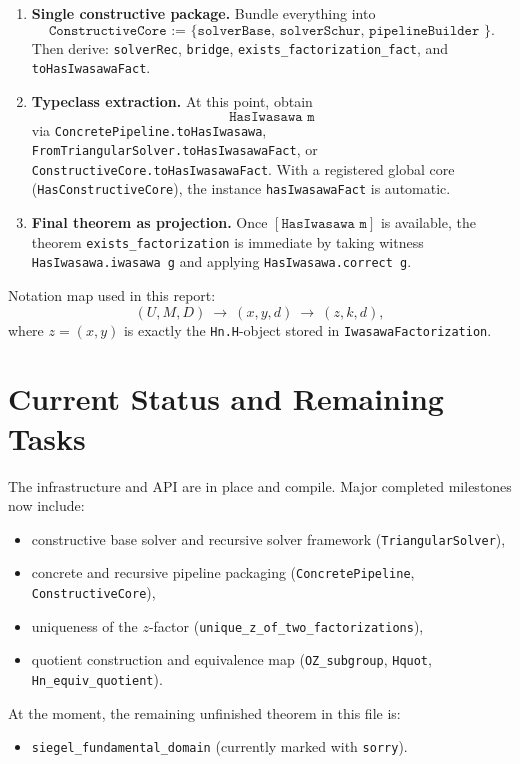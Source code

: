 \documentclass[11pt]{article}
\begin{document}
\begin{enumerate}[leftmargin=1.5em]
\item \textbf{Single constructive package.}
Bundle everything into
\[
\texttt{ConstructiveCore := \{ solverBase, solverSchur, pipelineBuilder \}}.
\]
Then derive:
\texttt{solverRec}, \texttt{bridge},
\texttt{exists\_factorization\_fact}, and \texttt{toHasIwasawaFact}.

\item \textbf{Typeclass extraction.}
At this point, obtain
\[
\texttt{HasIwasawa m}
\]
via \texttt{ConcretePipeline.toHasIwasawa},
\texttt{FromTriangularSolver.toHasIwasawaFact}, or
\texttt{ConstructiveCore.toHasIwasawaFact}.
With a registered global core (\texttt{HasConstructiveCore}), the instance
\texttt{hasIwasawaFact} is automatic.

\item \textbf{Final theorem as projection.}
Once \([\texttt{HasIwasawa m}]\) is available, the theorem
\texttt{exists\_factorization} is immediate by taking witness
\texttt{HasIwasawa.iwasawa g} and applying \texttt{HasIwasawa.correct g}.
\end{enumerate}

\noindent
Notation map used in this report:
\[
(U,M,D)\ \longrightarrow\ (x,y,d)\ \longrightarrow\ (z,k,d),
\]
where \(z=(x,y)\) is exactly the \texttt{Hn.H}-object stored in
\texttt{IwasawaFactorization}.

\section{Current Status and Remaining Tasks}
The infrastructure and API are in place and compile.
Major completed milestones now include:
\begin{itemize}[leftmargin=1.5em]
\item constructive base solver and recursive solver framework (\texttt{TriangularSolver}),
\item concrete and recursive pipeline packaging (\texttt{ConcretePipeline}, \texttt{ConstructiveCore}),
\item uniqueness of the \(z\)-factor (\texttt{unique\_z\_of\_two\_factorizations}),
\item quotient construction and equivalence map (\texttt{OZ\_subgroup}, \texttt{Hquot}, \texttt{Hn\_equiv\_quotient}).
\end{itemize}
At the moment, the remaining unfinished theorem in this file is:
\begin{itemize}[leftmargin=1.5em]
\item \texttt{siegel\_fundamental\_domain} (currently marked with \texttt{sorry}).
\end{itemize}
\end{document}
